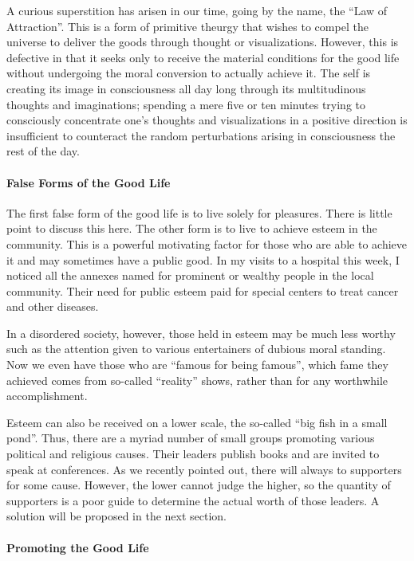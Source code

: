 A curious superstition has arisen in our time, going by the name, the ``Law of Attraction''. This is a form of primitive theurgy that wishes to compel the universe to deliver the goods through thought or visualizations. However, this is defective in that it seeks only to receive the material conditions for the good life without undergoing the moral conversion to actually achieve it. The self is creating its image in consciousness all day long through its multitudinous thoughts and imaginations; spending a mere five or ten minutes trying to consciously concentrate one's thoughts and visualizations in a positive direction is insufficient to counteract the random perturbations arising in consciousness the rest of the day.

\paragraph{False Forms of the Good Life}


The first false form of the good life is to live solely for pleasures. There is little point to discuss this here. The other form is to live to achieve esteem in the community. This is a powerful motivating factor for those who are able to achieve it and may sometimes have a public good. In my visits to a hospital this week, I noticed all the annexes named for prominent or wealthy people in the local community. Their need for public esteem paid for special centers to treat cancer and other diseases.

In a disordered society, however, those held in esteem may be much less worthy such as the attention given to various entertainers of dubious moral standing. Now we even have those who are ``famous for being famous'', which fame they achieved comes from so-called ``reality'' shows, rather than for any worthwhile accomplishment.

Esteem can also be received on a lower scale, the so-called ``big fish in a small pond''. Thus, there are a myriad number of small groups promoting various political and religious causes. Their leaders publish books and are invited to speak at conferences. As we recently pointed out, there will always to supporters for some cause. However, the lower cannot judge the higher, so the quantity of supporters is a poor guide to determine the actual worth of those leaders. A solution will be proposed in the next section.

\paragraph{Promoting the Good Life}



